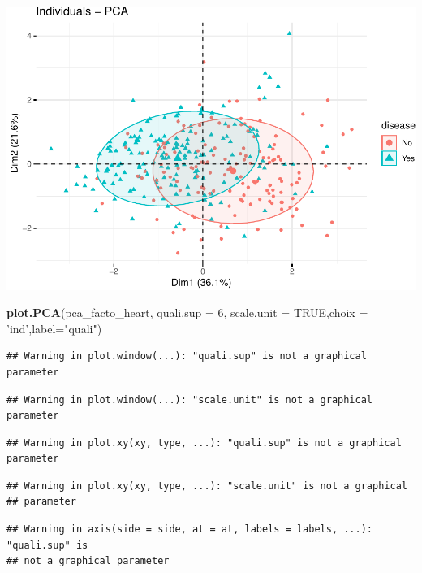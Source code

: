 \documentclass[]{article}
\newenvironment{Shaded}{\begin{snugshade}}{\end{snugshade}}
\newcommand{\KeywordTok}[1]{\textcolor[rgb]{0.13,0.29,0.53}{\textbf{#1}}}
\newcommand{\DataTypeTok}[1]{\textcolor[rgb]{0.13,0.29,0.53}{#1}}
\newcommand{\DecValTok}[1]{\textcolor[rgb]{0.00,0.00,0.81}{#1}}
\newcommand{\StringTok}[1]{\textcolor[rgb]{0.31,0.60,0.02}{#1}}
\newcommand{\OtherTok}[1]{\textcolor[rgb]{0.56,0.35,0.01}{#1}}
\newcommand{\NormalTok}[1]{#1}
\begin{document}
\includegraphics{project_report_files/figure-latex/unnamed-chunk-11-1.pdf}

\begin{Shaded}
\begin{Highlighting}[]
\KeywordTok{plot.PCA}\NormalTok{(pca_facto_heart, }\DataTypeTok{quali.sup =} \DecValTok{6}\NormalTok{, }\DataTypeTok{scale.unit =} \OtherTok{TRUE}\NormalTok{,}\DataTypeTok{choix =} \StringTok{'ind'}\NormalTok{,}\DataTypeTok{label=}\StringTok{"quali"}\NormalTok{)}
\end{Highlighting}
\end{Shaded}

\begin{verbatim}
## Warning in plot.window(...): "quali.sup" is not a graphical parameter
\end{verbatim}

\begin{verbatim}
## Warning in plot.window(...): "scale.unit" is not a graphical parameter
\end{verbatim}

\begin{verbatim}
## Warning in plot.xy(xy, type, ...): "quali.sup" is not a graphical parameter
\end{verbatim}

\begin{verbatim}
## Warning in plot.xy(xy, type, ...): "scale.unit" is not a graphical
## parameter
\end{verbatim}

\begin{verbatim}
## Warning in axis(side = side, at = at, labels = labels, ...): "quali.sup" is
## not a graphical parameter
\end{verbatim}
\end{document}
